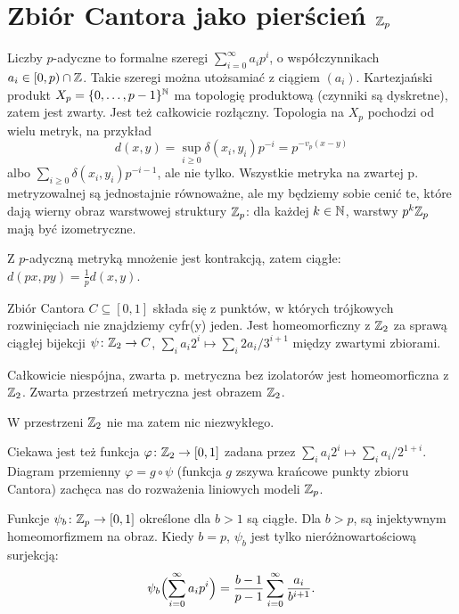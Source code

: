 \section{Zbiór Cantora jako pierścień $\mathbb Z_p$}
Liczby  $p$-adyczne to formalne szeregi $\sum_{i=0}^\infty a_i p^i$, o współczynnikach $a_i \in [0, p) \cap \mathbb Z$.
Takie szeregi można utożsamiać z ciągiem $(a_i)$.
Kartezjański produkt $X_p = \{0, \dots, p-1\}^\mathbb N$ ma topologię produktową (czynniki są dyskretne), zatem jest zwarty.
Jest też całkowicie rozłączny.
Topologia na $X_p$ pochodzi od wielu metryk, na przykład \[d(x, y) = \sup_{i \ge 0} \delta(x_i, y_i) p^{-i} = p^{-v_p(x-y)}\]
albo $\sum_{i \ge 0} \delta(x_i,y_i)p^{-i-1}$, ale nie tylko.
Wszystkie metryka na zwartej p. metryzowalnej są jednostajnie równoważne, ale my będziemy sobie cenić te, które dają wierny obraz warstwowej struktury $\mathbb Z_p$: dla każdej $k \in \mathbb N$, warstwy $p^k \mathbb Z_p$ mają być izometryczne.

\begin{fakt}
	Z $p$-adyczną metryką mnożenie jest kontrakcją, zatem ciągłe: $d(px, py) = \frac 1p d(x, y)$.
\end{fakt}

Zbiór Cantora $C \subseteq [0,1]$ składa się z punktów, w których trójkowych rozwinięciach nie znajdziemy cyfr(y) jeden.
Jest homeomorficzny z $\mathbb Z_2$ za sprawą ciągłej bijekcji $\psi \colon \mathbb Z_2 \to C$, $\sum_i a_i2^i \mapsto \sum_i 2a_i/3^{i+1}$ między zwartymi zbiorami.

\begin{fakt}
	Całkowicie  niespójna, zwarta p. metryczna bez izolatorów jest homeomorficzna z $\mathbb Z_2$.
	Zwarta przestrzeń metryczna jest obrazem $\mathbb Z_2$.
\end{fakt}

W przestrzeni $\mathbb Z_2$ nie ma zatem nic niezwykłego.

Ciekawa jest też funkcja $\varphi \colon \mathbb Z_2 \to [0,1]$ zadana przez $\sum_i a_i2^i \mapsto \sum_i a_i/2^{1+i}$.
Diagram przemienny $\varphi = g \circ \psi$ (funkcja $g$ zszywa krańcowe punkty zbioru Cantora) zachęca nas do rozważenia liniowych modeli $\mathbb Z_p$.

\begin{fakt}
	Funkcje $\psi_b \colon \mathbb Z_p \to [0,1]$ określone dla $b > 1$ są ciągłe.
	Dla $b > p$, są injektywnym homeomorfizmem na obraz.
	Kiedy $b = p$, $\psi_b$ jest tylko nieróżnowartościową surjekcją: \[\psi_b \Bigl(\sum_{i = 0}^\infty a_i p^i\Bigr) = \frac {b - 1 }{p-1} \sum_{i = 0}^\infty \frac{a_i}{b^{i+1}}.\]
\end{fakt}

